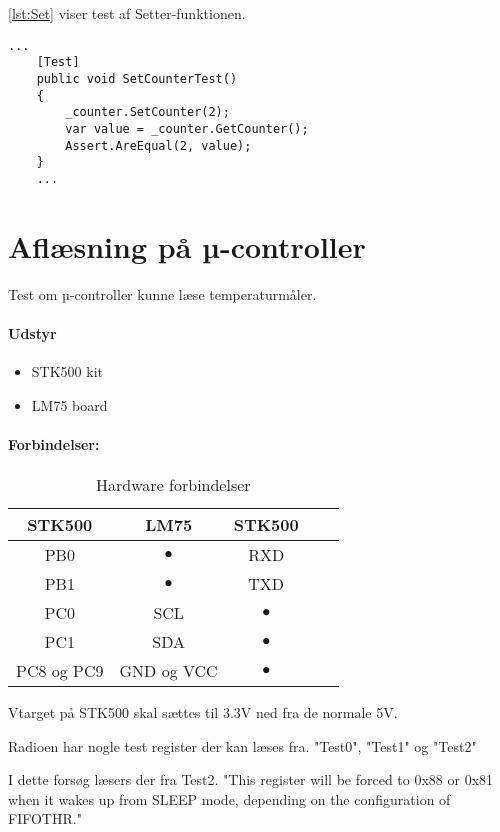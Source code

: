 \documentclass[Main]{subfiles}
\begin{document}
\codeTitle \ref{lst:Set} viser test af Setter-funktionen.
\begin{lstlisting}[caption=Setter-funktion, style=Code-C, label=lst:Set]
	...
	[Test]
	public void SetCounterTest()
	{
		_counter.SetCounter(2);
		var value = _counter.GetCounter();
		Assert.AreEqual(2, value);
	}
	...
\end{lstlisting}



\newpage


\newpage
\section{Aflæsning på µ-controller}
Test om µ-controller kunne læse temperaturmåler.

\paragraph{Udstyr}

\begin{itemize}
\item STK500 kit
\item LM75 board
\end{itemize}


\paragraph{Forbindelser:}

\begin{table}[ht]
\centering
\begin{tabular}{c c c c c}
\hline 
STK500 & LM75 &  STK500 \\ 
\hline 
PB0 & $\bullet$ & RXD \\
PB1 & $\bullet$ & TXD \\ 
PC0 & SCL & $\bullet$ \\
PC1 & SDA & $\bullet$ \\
PC8 og PC9 & GND og VCC & $\bullet$ \\
\hline 
\end{tabular} 
\caption{Hardware forbindelser}
\label{tbl:oversigt}
\end{table}


Vtarget på STK500 skal sættes til 3.3V ned fra de normale 5V.

Radioen har nogle test register der kan læses fra. "Test0", "Test1" og "Test2" 

I dette forsøg læsers der fra Test2.
"This register will be forced to 0x88 or 0x81 when it wakes up from
SLEEP mode, depending on the configuration of FIFOTHR." \cite{TI-cc1101}
\end{document}
